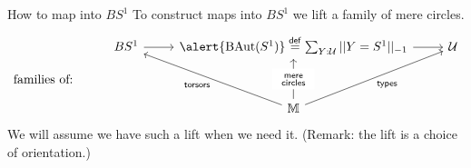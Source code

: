 \begin{frame}{How to map into \( BS^1 \)}
To construct maps into \( BS^1 \) we \alert{lift} a family of \alert{mere circles}.
\[\begin{tikzcd}[ampersand replacement=\&, row sep=small]
  \& {BS^1} \& {\alert{\BAut (S^1)}\stackrel{\mathrm{def}}{=}\sum_{Y:\uni}||Y=S^1||_{-1}} \& \uni \\
  {\text{families of:}} \\
  \&\& \mm
  \arrow[from=1-2, to=1-3]
  \arrow[from=1-3, to=1-4]
  \arrow["{\mathrm{torsors}}", from=3-3, to=1-2]
  \arrow["\begin{array}{c} \substack{\mathrm{mere}\\ \mathrm{circles}} \end{array}"{description}, from=3-3, to=1-3]
  \arrow["{\mathrm{types}}"', from=3-3, to=1-4]
\end{tikzcd}\]
We will assume we have such a lift when we need it. (Remark: the lift is a choice of \alert{orientation}.)

\end{frame}

